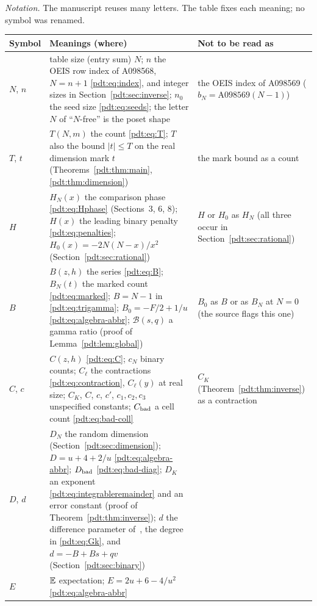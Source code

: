 \begin{writenote}
\emph{Notation.} The manuscript reuses many letters. The table fixes each
meaning; no symbol was renamed.

\smallskip
\begingroup\renewcommand{\arraystretch}{1.1}
\begin{longtable}{@{}>{\raggedright\arraybackslash}p{0.55in}>{\raggedright\arraybackslash}p{3.7in}>{\raggedright\arraybackslash}p{1.9in}@{}}
\toprule
Symbol & Meanings (where) & Not to be read as\\
\midrule
\endhead
$N$, $n$ & table size (entry sum) $N$; $n$ the OEIS row index of A098568,
 $N=n+1$ \eqref{pdt:eq:index}, and integer sizes in
 Section~\ref{pdt:sec:inverse}; $n_0$ the seed size \eqref{pdt:eq:seeds};
 the letter $N$ of ``$N$-free'' is the poset shape & the OEIS index of
 A098569 ($b_N=\mathrm{A098569}(N-1)$)\\
$T$, $t$ & $T(N,m)$ the count \eqref{pdt:eq:T}; $T$ also the bound
 $|t|\le T$ on the real dimension mark $t$ (Theorems~\ref{pdt:thm:main},
 \ref{pdt:thm:dimension}) & the mark bound as a count\\
$H$ & $H_N(x)$ the comparison phase \eqref{pdt:eq:Hphase} (Sections~3, 6,
 8); $H(x)$ the leading binary penalty \eqref{pdt:eq:penalties};
 $H_0(x)=-2N(N-x)/x^2$ (Section~\ref{pdt:sec:rational}) & $H$ or $H_0$ as
 $H_N$ (all three occur in Section~\ref{pdt:sec:rational})\\
$B$ & $B(z,h)$ the series \eqref{pdt:eq:B}; $B_N(t)$ the marked count
 \eqref{pdt:eq:marked}; $B=N-1$ in \eqref{pdt:eq:trigamma};
 $B_0=-F/2+1/u$ \eqref{pdt:eq:algebra-abbr}; $\mathcal B(s,q)$ a gamma
 ratio (proof of Lemma~\ref{pdt:lem:global}) & $B_0$ as $B$ or as
 $B_N$ at $N=0$ (the source flags this one)\\
$C$, $c$ & $C(z,h)$ \eqref{pdt:eq:C}; $c_N$ binary counts; $C_\ell$ the
 contractions \eqref{pdt:eq:contraction}, $C_\ell(y)$ at real size;
 $C_K$, $C$, $c$, $c'$, $c_1,c_2,c_3$ unspecified constants;
 $C_{\rm bad}$ a cell count \eqref{pdt:eq:bad-coll} & $C_K$
 (Theorem~\ref{pdt:thm:inverse}) as a contraction\\
$D$, $d$ & $D_N$ the random dimension (Section~\ref{pdt:sec:dimension});
 $D=u+4+2/u$ \eqref{pdt:eq:algebra-abbr}; $D_{\rm bad}$
 \eqref{pdt:eq:bad-diag}; $D_K$ an exponent \eqref{pdt:eq:integrableremainder}
 and an error constant (proof of Theorem~\ref{pdt:thm:inverse}); $d$ the
 difference parameter of~\cite{ccs}, the degree in \eqref{pdt:eq:Gk}, and
 $d=-B+Bs+qv$ (Section~\ref{pdt:sec:binary}) & \\
$E$ & $\mathbb E$ expectation; $E=2u+6-4/u^2$ \eqref{pdt:eq:algebra-abbr} & \\

\end{longtable}
\end{writenote}
